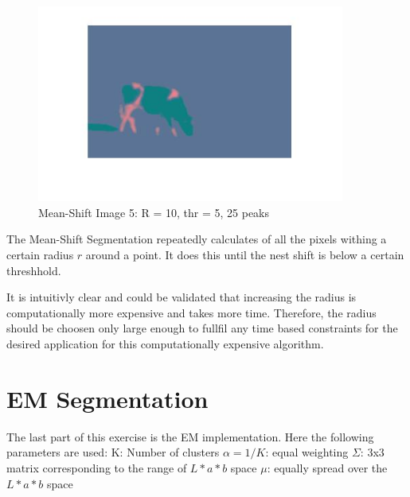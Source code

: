 \documentclass[12pt]{article}
\begin{document}
\vspace{5mm}
\begin{figure}[ht]
	\centering
	\includegraphics[width=0.9\textwidth]{r10p25b.jpg}
	\caption{Mean-Shift Image 5: R = 10, thr = 5, 25 peaks}
	\label{fig1}
\end{figure}
\vspace{5mm}

The Mean-Shift Segmentation repeatedly calculates of all the pixels withing a certain radius $r$ around a point. It does this until the nest shift is below a certain threshhold.



It is intuitivly clear and could be validated that increasing the radius is computationally more expensive and takes more time. Therefore, the radius should be choosen only large enough to fullfil any time based constraints for the desired application for this computationally expensive algorithm. 
 




\section{EM Segmentation}
The last part of this exercise is the EM implementation. Here the following parameters are used: 
\vspace{5mm}
\newline
K: Number of clusters
\vspace{5mm}
\newline
$\alpha = 1/K$: equal weighting
\vspace{5mm}
\newline
$\Sigma$: 3x3 matrix corresponding to the range of $L*a*b$ space
\vspace{5mm}
\newline
$\mu$: equally spread over the $L*a*b$ space
\end{document}
